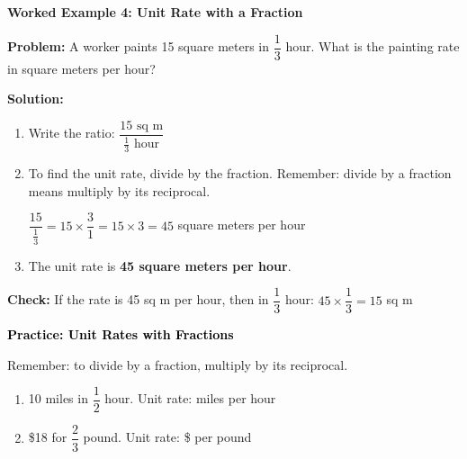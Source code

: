 \documentclass[12pt, letterpaper, fleqn]{article}
\newcommand{\blankshorter}{\underline{\hspace{1.5cm}}}
\begin{document}
\begin{tcolorbox}[colback=white, colframe=black!25, boxrule=0.6pt, arc=4mm, left=6mm, right=6mm, top=5mm, bottom=5mm]

\textbf{Worked Example 4: Unit Rate with a Fraction}

\medskip

\textbf{Problem:} A worker paints 15 square meters in $\dfrac{1}{3}$ hour. What is the painting rate in square meters per hour?

\medskip

\noindent
\textbf{Solution:}

\begin{enumerate}
    \item Write the ratio: $\dfrac{15 \text{ sq m}}{\frac{1}{3} \text{ hour}}$
    
    \item To find the unit rate, divide by the fraction. Remember: divide by a fraction means multiply by its reciprocal.
    
    $\dfrac{15}{\frac{1}{3}} = 15 \times \dfrac{3}{1} = 15 \times 3 = 45$ square meters per hour
    
    \item The unit rate is \textbf{45 square meters per hour}.
\end{enumerate}

\medskip

\noindent
\textbf{Check:} If the rate is 45 sq m per hour, then in $\dfrac{1}{3}$ hour: $45 \times \dfrac{1}{3} = 15$ sq m 

\end{tcolorbox}

\vspace{4mm}

\begin{tcolorbox}[colback=customteal!20]
\large\textcolor{black}{\textbf{Practice: Unit Rates with Fractions}}
\end{tcolorbox}

\noindent
Remember: to divide by a fraction, multiply by its reciprocal.

\vspace{3mm}

\begin{enumerate}[itemsep=1.5cm, leftmargin=0.6cm]

\item 10 miles in $\dfrac{1}{2}$ hour. Unit rate: \blankshorter \; miles per hour

\item \$18 for $\dfrac{2}{3}$ pound. Unit rate: \$ \blankshorter \; per pound

\end{enumerate}
\end{document}
